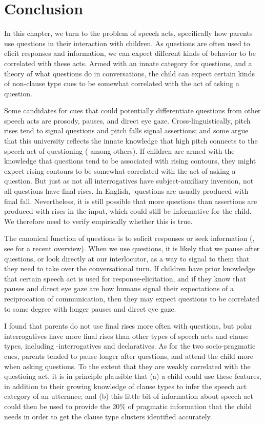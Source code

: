 \section{Conclusion}
\label{sec:engsp:discussion}
In this chapter, we turn to the problem of speech acts, specifically how parents use questions in their interaction with children. As questions are often used to elicit responses and information, we can expect different kinds of behavior to be correlated with these acts. Armed with an innate category for questions, and a theory of what questions do in conversations, the child can expect certain kinds of non-clause type cues to be somewhat correlated with the act of asking a question. 

Some candidates for cues that could potentially differentiate questions from other speech acts are prosody, pauses, and direct eye gaze. Cross-linguistically, pitch rises tend to signal questions and pitch falls signal assertions; and some argue that this university reflects the innate knowledge that high pitch connects to the speech act of questioning (\cite{ohala1984,gussenhovenchen2000,gussenhoven2002} among others). If children are armed with the knowledge that questions tend to be associated with rising contours, they might expect rising contours to be somewhat correlated with the act of asking a question. But just as not all interrogatives have subject-auxiliary inversion, not all questions have final rises. In English, \twh-questions are usually produced with final fall. Nevertheless, it is still possible that more questions than assertions are produced with rises in the input, which could still be informative for the child. We therefore need to verify empirically whether this is true.

The canonical function of questions is to solicit responses or seek information (\citealt{searle1975tax,levinson1983,stivers2010}, see \citealt{krifka2011q} for a recent overview). When we use questions, it is likely that we pause after questions, or look directly at our interlocutor, as a way to signal to them that they need to take over the conversational turn. If children have prior knowledge that certain speech act is used for response-elicitation, and if they know that pauses and direct eye gaze are how humans signal their expectations of a reciprocation of communication, then they may expect questions to be correlated to some degree with longer pauses and direct eye gaze.

I found that parents do not use final rises more often with questions, but polar interrogatives have more final rises than other types of speech acts and clause types, including \twh-interrogatives and declaratives. As for the two socio-pragmatic cues, parents tended to pause longer after questions, and attend the child more when asking questions. To the extent that they are weakly correlated with the questioing act, it is in principle plausible that (a) a child could use these features, in addition to their growing knowledge of clause types to infer the speech act category of an utterance; and (b) this little bit of information about speech act could then be used to provide the 20\% of pragmatic information that the child needs in order to get the clause type clusters identified accurately.


